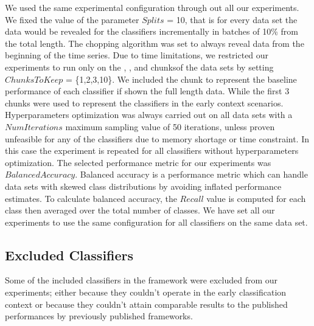 We used the same experimental configuration through out all our experiments.
We fixed the value of the parameter $Splits$ = 10, that is for every data set the data would be revealed for the classifiers incrementally in batches of 10\% from the total length.
The chopping algorithm was set to always reveal data from the beginning of the time series.
Due to time limitations, we restricted our experiments to run only on the , ,  and  chunksof the data sets by setting $ChunksToKeep$ = \{1,2,3,10\}.
We included the  chunk to represent the baseline performance of each classifier if shown the full length data.
While the first 3 chunks were used to represent the classifiers in the early context scenarios.
Hyperparameters optimization was always carried out on all data sets with a $NumIterations$ maximum sampling value of 50 iterations, unless proven unfeasible for any of the classifiers due to memory shortage or time constraint.
In this case the experiment is repeated for all classifiers without hyperparameters optimization.
The selected performance metric for our experiments was $Balanced Accuracy$.
Balanced accuracy is a performance metric which can handle data sets with skewed class distributions by avoiding inflated performance estimates.
To calculate balanced accuracy, the $Recall$ value is computed for each class then averaged over the total number of classes.
We have set all our experiments to use the same configuration for all classifiers on the same data set.


\subsection{Excluded Classifiers}
\label{SubsectionExcludedClassifiers}
Some of the included classifiers in the framework were excluded from our experiments; either because they couldn't operate in the early classification context
or because they couldn't attain comparable results to the published performances by previously published frameworks.

